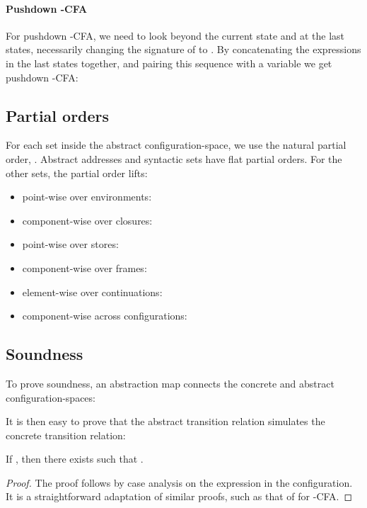         \paragraph{Pushdown -CFA}

        For pushdown -CFA, we need to look beyond the current state
        and at the last  states, necessarily changing the signature of  to .
By concatenating the expressions in the last  states together, and
        pairing this sequence with a variable we get pushdown -CFA:







  \subsection{Partial orders}

  For each set  inside the abstract configuration-space, we use the
  natural partial order, .
Abstract addresses and syntactic sets have flat partial orders.
For the other sets, the
  partial order lifts:
  \begin{itemize}
\item point-wise over environments:
  



\item component-wise over closures:
  

\item point-wise over stores:
  

\item component-wise over frames:
  

\item element-wise over continuations:
  

\item component-wise across configurations:
  
  \end{itemize}



  \subsection{Soundness}

  To prove soundness,  an abstraction map  connects the
  concrete and abstract configuration-spaces:
  
It is then easy to prove that the abstract transition relation
            simulates the concrete transition relation:
            \begin{theorem}
If , then
there exists  such that .
  \end{theorem}
  \begin{proof}
  The proof follows by case analysis on the
  expression in the configuration.
It is a straightforward adaptation of similar proofs, such as that of
  \citet{mattmight:Might:2007:Dissertation} for -CFA.
  \end{proof}




